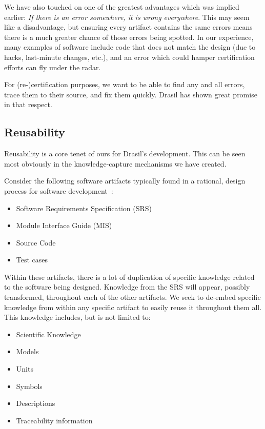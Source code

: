 \documentclass[sigconf]{acmart}
\begin{document}
We have also touched on one of the greatest advantages which was implied 
earlier: \emph{If there is an error somewhere, it is wrong everywhere}. This 
may seem like a disadvantage, but ensuring every artifact contains the same 
errors means there is a much greater chance of those errors being spotted. In 
our experience, many examples of software include code that does not match the 
design (due to hacks, last-minute changes, etc.), and an error which could 
hamper certification efforts can fly under the radar. 

For (re-)certification purposes, we want to be able to find any and all errors, 
trace them to their source, and fix them quickly. Drasil has shown great 
promise in that respect.

\subsection{Reusability}

Reusability is a core tenet of ours for Drasil's development. This can be seen 
most obviously in the knowledge-capture mechanisms we have created. 

Consider the following software artifacts typically found in a rational, design 
process for software development~\cite{ParnasAndClements1986}:

\begin{itemize}
\item Software Requirements Specification (SRS)
\item Module Interface Guide (MIS)
\item Source Code
\item Test cases
\end{itemize}

Within these artifacts, there is a lot of duplication of specific knowledge 
related to the software being designed. Knowledge from the SRS will appear, 
possibly transformed, throughout each of the other artifacts. We seek to 
de-embed specific knowledge from within any specific artifact to easily reuse 
it throughout them all. This knowledge includes, but is not limited to:

\begin{itemize}
\item Scientific Knowledge
\item Models
\item Units
\item Symbols
\item Descriptions
\item Traceability information
\end{itemize}
\end{document}
